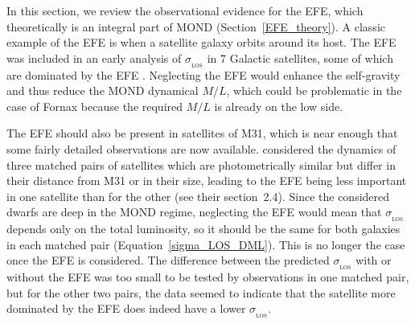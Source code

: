 \documentclass[fleqn,usenatbib,useAMS,onecolumn]{mnras} %
\begin{document}
In this section, we review the observational evidence for the EFE, which theoretically is an integral part of MOND (Section~\ref{EFE_theory}). A classic example of the EFE is when a satellite galaxy orbits around its host. The EFE was included in an early analysis of $\sigma_{_\text{LOS}}$ in 7 Galactic satellites, some of which are dominated by the EFE \citep{Milgrom_1995}. Neglecting the EFE would enhance the self-gravity and thus reduce the MOND dynamical $M/L$, which could be problematic in the case of Fornax because the required $M/L$ is already on the low side.

The EFE should also be present in satellites of M31, which is near enough that some fairly detailed observations are now available. \citet{McGaugh_2013b} considered the dynamics of three matched pairs of satellites which are photometrically similar but differ in their distance from M31 or in their size, leading to the EFE being less important in one satellite than for the other (see their section~2.4). Since the considered dwarfs are deep in the MOND regime, neglecting the EFE would mean that $\sigma_{_\text{LOS}}$ depends only on the total luminosity, so it should be the same for both galaxies in each matched pair (Equation~\ref{sigma_LOS_DML}). This is no longer the case once the EFE is considered. The difference between the predicted $\sigma_{_\text{LOS}}$ with or without the EFE was too small to be tested by observations in one matched pair, but for the other two pairs, the data seemed to indicate that the satellite more dominated by the EFE does indeed have a lower $\sigma_{_\text{LOS}}$.
\end{document}
